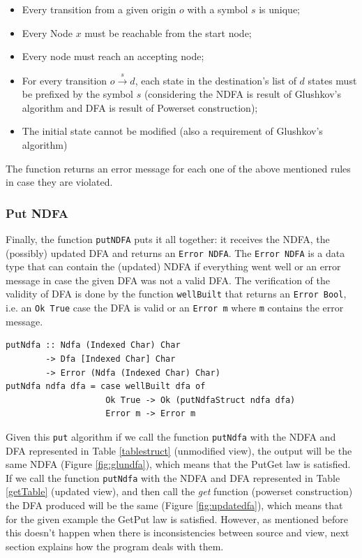 \begin{itemize}
    \item Every transition from a given origin $o$ with a symbol $s$ is unique;
    \item Every Node $x$ must be reachable from the start node;
    \item Every node must reach an accepting node;
    \item For every transition $o \xrightarrow{s} d $, each state in the destination's list of $d$ states must be prefixed by the symbol $s$ (considering the NDFA is result of Glushkov's algorithm and DFA is result of Powerset construction);
    \item The initial state cannot be modified (also a requirement of Glushkov's algorithm)
\end{itemize}

The function returns an error message for each one of the above mentioned rules in case they are violated. 

\subsubsection{Put NDFA}
Finally, the function \texttt{putNDFA} puts it all together: it receives the NDFA, the (possibly) updated DFA and returns an \texttt{Error NDFA}. The \texttt{Error NDFA} is a data type that can contain the (updated) NDFA if everything went well or an error message in case the given DFA was not a valid DFA. The verification of the validity of DFA is done by the function \texttt{wellBuilt} that returns an \texttt{Error Bool}, i.e. an \texttt{Ok True} case the DFA is valid or an \texttt{Error m} where \texttt{m} contains the error message.

\vspace{5mm}
\begin{verbatim}
putNdfa :: Ndfa (Indexed Char) Char 
        -> Dfa [Indexed Char] Char
        -> Error (Ndfa (Indexed Char) Char)
putNdfa ndfa dfa = case wellBuilt dfa of 
                    Ok True -> Ok (putNdfaStruct ndfa dfa)
                    Error m -> Error m
\end{verbatim}

Given this \texttt{put} algorithm if we call the function \texttt{putNdfa} with the NDFA and DFA represented in Table \ref{tablestruct} (unmodified view), the output will be the same NDFA (Figure \ref{fig:glundfa}), which means that the PutGet law is satisfied. 
If we call the function \texttt{putNdfa} with the NDFA and DFA represented in Table \ref{getTable} (updated view), and then call the \textit{get} function (powerset construction) the DFA produced will be the same (Figure \ref{fig:updatedfa}), which means that for the given example the GetPut law is satisfied. However, as mentioned before this doesn't happen when there is inconsistencies between source and view, next section explains how the program deals with them.  


